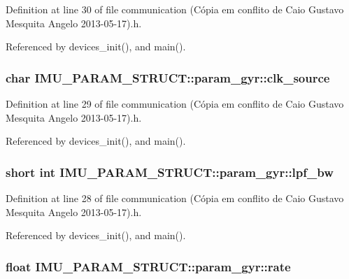 Definition at line 30 of file communication (\-Cópia em conflito de Caio Gustavo Mesquita Angelo 2013-\/05-\/17).\-h.



Referenced by devices\-\_\-init(), and main().

\hypertarget{structIMU__PARAM__STRUCT_1_1param__gyr_aca3b791cb480f2da4703d4c256a7de48}{
\subsubsection[{clk\-\_\-source}]{\setlength{\rightskip}{0pt plus 5cm}char I\-M\-U\-\_\-\-P\-A\-R\-A\-M\-\_\-\-S\-T\-R\-U\-C\-T\-::param\-\_\-gyr\-::clk\-\_\-source}}\label{structIMU__PARAM__STRUCT_1_1param__gyr_aca3b791cb480f2da4703d4c256a7de48}


Definition at line 29 of file communication (\-Cópia em conflito de Caio Gustavo Mesquita Angelo 2013-\/05-\/17).\-h.



Referenced by devices\-\_\-init(), and main().

\hypertarget{structIMU__PARAM__STRUCT_1_1param__gyr_aa612f7299b43a1bf1fc597688c2fa02d}{
\subsubsection[{lpf\-\_\-bw}]{\setlength{\rightskip}{0pt plus 5cm}short int I\-M\-U\-\_\-\-P\-A\-R\-A\-M\-\_\-\-S\-T\-R\-U\-C\-T\-::param\-\_\-gyr\-::lpf\-\_\-bw}}\label{structIMU__PARAM__STRUCT_1_1param__gyr_aa612f7299b43a1bf1fc597688c2fa02d}


Definition at line 28 of file communication (\-Cópia em conflito de Caio Gustavo Mesquita Angelo 2013-\/05-\/17).\-h.



Referenced by devices\-\_\-init(), and main().

\hypertarget{structIMU__PARAM__STRUCT_1_1param__gyr_a5aa70e1e9634411c89aacfbc570cc91c}{
\subsubsection[{rate}]{\setlength{\rightskip}{0pt plus 5cm}float I\-M\-U\-\_\-\-P\-A\-R\-A\-M\-\_\-\-S\-T\-R\-U\-C\-T\-::param\-\_\-gyr\-::rate}}\label{structIMU__PARAM__STRUCT_1_1param__gyr_a5aa70e1e9634411c89aacfbc570cc91c}


